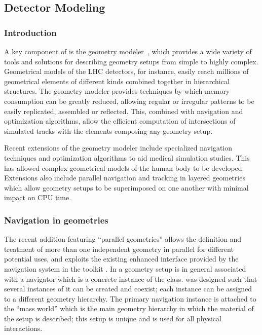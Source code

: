 \label{sec:detmod}

\subsection{\textbf{Detector Modeling}}

\subsubsection{Introduction}
A key component of \Gfour{} is the geometry modeler~\cite{detmodeling:modeler},
which provides a wide variety of tools and solutions for describing geometry 
setups from simple to highly complex.  Geometrical models of the LHC detectors,
for instance, easily reach millions of geometrical elements of different kinds
combined together in hierarchical structures.  The geometry modeler provides
techniques by which memory consumption can be greatly reduced, allowing regular 
or irregular patterns to be easily replicated, assembled or reflected.  This, 
combined with navigation and optimization algorithms, allow the efficient 
computation of intersections of simulated tracks with the elements composing
any geometry setup.

Recent extensions of the geometry modeler include specialized navigation
techniques and optimization algorithms to aid medical simulation studies. 
This has allowed complex geometrical models of the human body to be developed.
Extensions also include parallel navigation and tracking in layered geometries
which allow geometry setups to be superimposed on one another with minimal 
impact on CPU time.

\subsubsection{Navigation in geometries} \label{sec:nav}
The recent addition featuring ``parallel geometries'' allows the definition and
treatment of more than one independent geometry in parallel for different 
potential uses, and exploits the existing enhanced interface provided by the 
navigation system in the \Gfour{} toolkit \cite{detmodeling:parGeom}.  In 
\Gfour{} a geometry setup is in general associated with a navigator which is a
concrete instance of the  class.   was 
designed such that several instances of it can be created and coexist; each 
instance can be assigned to a different geometry hierarchy.  The primary 
navigation instance is attached to the ``mass world'' which is the main geometry 
hierarchy in which the material of the setup is described;  this setup is unique
and is used for all physical interactions.

